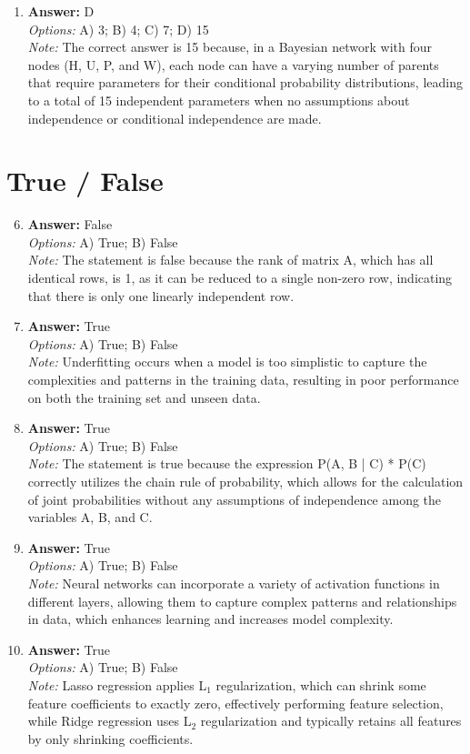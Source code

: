\documentclass[12pt]{article}
\begin{document}
\begin{enumerate}[label=\arabic*.]
\item \textbf{Answer:} D
\\ \textit{Options:} A) 3; B) 4; C) 7; D) 15
\\ \textit{Note:} The correct answer is 15 because, in a Bayesian network with four nodes (H, U, P, and W), each node can have a varying number of parents that require parameters for their conditional probability distributions, leading to a total of 15 independent parameters when no assumptions about independence or conditional independence are made.
\end{enumerate}

\section*{True / False}
\begin{enumerate}[label=\arabic*.]
\setcounter{enumi}{5}
\item \textbf{Answer:} False
\\ \textit{Options:} A) True; B) False
\\ \textit{Note:} The statement is false because the rank of matrix A, which has all identical rows, is 1, as it can be reduced to a single non-zero row, indicating that there is only one linearly independent row.
\item \textbf{Answer:} True
\\ \textit{Options:} A) True; B) False
\\ \textit{Note:} Underfitting occurs when a model is too simplistic to capture the complexities and patterns in the training data, resulting in poor performance on both the training set and unseen data.
\item \textbf{Answer:} True
\\ \textit{Options:} A) True; B) False
\\ \textit{Note:} The statement is true because the expression P(A, B | C) * P(C) correctly utilizes the chain rule of probability, which allows for the calculation of joint probabilities without any assumptions of independence among the variables A, B, and C.
\item \textbf{Answer:} True
\\ \textit{Options:} A) True; B) False
\\ \textit{Note:} Neural networks can incorporate a variety of activation functions in different layers, allowing them to capture complex patterns and relationships in data, which enhances learning and increases model complexity.
\item \textbf{Answer:} True
\\ \textit{Options:} A) True; B) False
\\ \textit{Note:} Lasso regression applies L$_{1}$ regularization, which can shrink some feature coefficients to exactly zero, effectively performing feature selection, while Ridge regression uses L$_{2}$ regularization and typically retains all features by only shrinking coefficients.
\end{enumerate}
\end{document}
